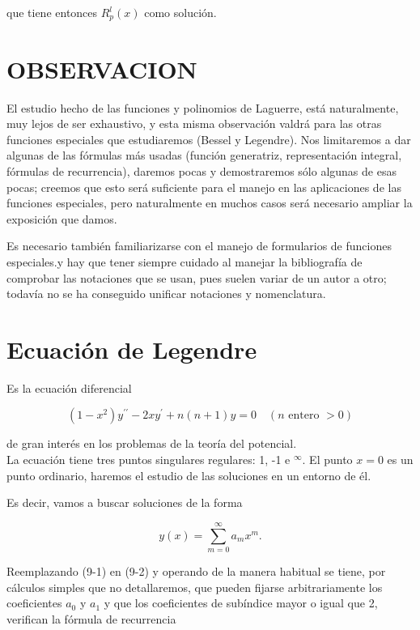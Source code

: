 \documentclass[10pt]{article}
\theoremstyle{plain}
\theoremstyle{definition}
\theoremstyle{remark}
\begin{document}
que tiene entonces $R_{p}^{l}(x)$ como solución.


\section*{OBSERVACION}
El estudio hecho de las funciones y polinomios de Laguerre, está naturalmente, muy lejos de ser exhaustivo, y esta misma observación valdrá para las otras funciones especiales que estudiaremos (Bessel y Legendre). Nos limitaremos a dar algunas de las fórmulas más usadas (función generatriz, representación integral, fórmulas de recurrencia), daremos pocas y demostraremos sólo algunas de esas pocas; creemos que esto será suficiente para el manejo en las aplicaciones de las funciones especiales, pero naturalmente en muchos casos será necesario ampliar la exposición que damos.

Es necesario también familiarizarse con el manejo de formularios de funciones especiales.y hay que tener siempre cuidado al manejar la bibliografía de comprobar las notaciones que se usan, pues suelen variar de un autor a otro; todavía no se ha conseguido unificar notaciones y nomenclatura.

\section{Ecuación de Legendre}
Es la ecuación diferencial


\begin{equation*}
\left(1-x^{2}\right) y^{\prime \prime}-2 x y^{\prime}+n(n+1) y=0 \quad(n \text { entero }>0) \tag{9-1}
\end{equation*}


de gran interés en los problemas de la teoría del potencial.\\
La ecuación tiene tres puntos singulares regulares: 1, -1 e ${ }^{\infty}$. El punto $x=0$ es un punto ordinario, haremos el estudio de las soluciones en un entorno de él.

Es decir, vamos a buscar soluciones de la forma


\begin{equation*}
y(x)=\sum_{m=0}^{\infty} a_{m} x^{m} . \tag{$9\cdot2$}
\end{equation*}


Reemplazando (9-1) en (9-2) y operando de la manera habitual se tiene, por cálculos simples que no detallaremos, que pueden fijarse arbitrariamente los coeficientes $a_{0}$ y $a_{1}$ y que los coeficientes de subíndice mayor o igual que 2, verifican la fórmula de recurrencia
\end{document}

